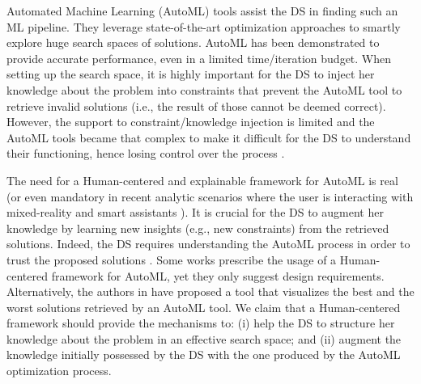 Automated Machine Learning (AutoML) tools assist the DS in finding such an ML pipeline.
They leverage state-of-the-art optimization approaches to smartly explore huge search spaces of solutions.
AutoML has been demonstrated to provide accurate performance, even in a limited time/iteration budget.
When setting up the search space, it is highly important for the DS to inject her knowledge about the problem into constraints that prevent the AutoML tool to retrieve invalid solutions (i.e., the result of those cannot be deemed correct).
However, the support to constraint/knowledge injection is limited and the AutoML tools became that complex to make it difficult for the DS to understand their functioning, hence losing control over the process \cite{XinWLSP21automationml}.

The need for a Human-centered and explainable framework for AutoML is real \cite{gil2019towards, lee2020human, wang2019human} (or even mandatory in recent analytic scenarios where the user is interacting with mixed-reality and smart assistants \cite{DBLP:conf/dolap/FranciaGR19,DBLP:journals/is/FranciaGG22}).
It is crucial for the DS to augment her knowledge by learning new insights (e.g., new constraints) from the retrieved solutions.
Indeed, the DS requires understanding the AutoML process in order to trust the proposed solutions \cite{drozdal2020trust}.
Some works \cite{gil2019towards, lee2020human, wang2019human} prescribe the usage of a Human-centered framework for AutoML, yet they only suggest design requirements.
Alternatively, the authors in \cite{ono2020pipelineprofiler} have proposed a tool that visualizes the best and the worst solutions retrieved by an AutoML tool.
We claim that a Human-centered framework should provide the mechanisms to: (i) help the DS to structure her knowledge about the problem in an effective search space; and (ii) augment the knowledge initially possessed by the DS with the one produced by the AutoML optimization process. 

